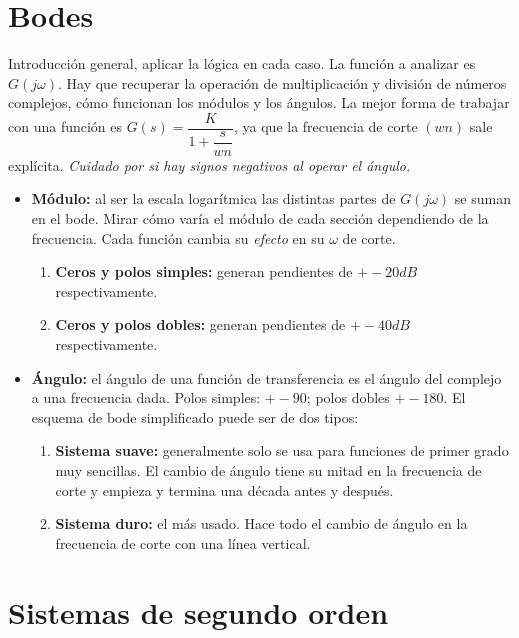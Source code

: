 \documentclass[a4paper, twocolumn, 10pt]{article}
\newlength{\du}
\begin{document}
\section{Bodes}

Introducción general, aplicar la lógica en cada caso. La función a analizar es $G(j\omega)$. Hay que recuperar la operación de multiplicación y división de números complejos, cómo funcionan los módulos y los ángulos. La mejor forma de trabajar con una función es $G(s) = \dfrac{K}{1 + \dfrac{s}{wn}}$, ya que la frecuencia de corte $(wn)$ sale explícita. \textit{Cuidado por si hay signos negativos al operar el ángulo.}

\begin{itemize}
	\item \textbf{Módulo:} al ser la escala logarítmica las distintas partes de $G(j\omega)$ se suman en el bode. Mirar cómo varía el módulo de cada sección dependiendo de la frecuencia. Cada función cambia su \textit{efecto} en su $\omega$ de corte.
	\begin{enumerate}
		\item \textbf{Ceros y polos simples:} generan pendientes de $+-20dB$ respectivamente.
		\item \textbf{Ceros y polos dobles:} generan pendientes de $+-40dB$ respectivamente.
	\end{enumerate}
	\item \textbf{Ángulo:} el ángulo de una función de transferencia es el ángulo del complejo a una frecuencia dada. Polos simples: $+-90$\textdegree; polos dobles $+-180$\textdegree. El esquema de bode simplificado puede ser de dos tipos:
	\begin{enumerate}
		\item \textbf{Sistema suave:} generalmente solo se usa para funciones de primer grado muy sencillas. El cambio de ángulo tiene su mitad en la frecuencia de corte y empieza y termina una década antes y después.
		\item \textbf{Sistema duro:} el más usado. Hace todo el cambio de ángulo en la frecuencia de corte con una línea vertical.
	\end{enumerate}
\end{itemize}

\section{Sistemas de segundo orden}
\end{document}
